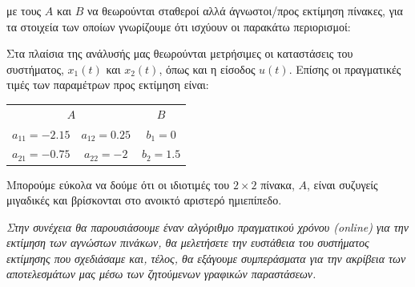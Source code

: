 \documentclass[12pt]{article} %
\numberwithin{equation}{section}  %
\begin{document}
\vspace{-\topsep}

\noindent με τους $A$ και $B$ να θεωρούνται σταθεροί αλλά άγνωστοι/προς εκτίμηση πίνακες, 
για τα στοιχεία των οποίων γνωρίζουμε ότι ισχύουν οι παρακάτω περιορισμοί: 

\vspace{-\topsep}

\begin{center}
    \fbox{$a_{11} \in [-3, -1]$ \& $b_2 \in [1, +\infty)$}
\end{center}


Στα πλαίσια της ανάλυσής μας θεωρούνται μετρήσιμες οι καταστάσεις του συστήματος, $x_1(t)$ και $x_2(t)$, όπως και η είσοδος $u(t)$. 
Επίσης οι πραγματικές τιμές των παραμέτρων προς εκτίμηση είναι: 

\vspace{-\topsep}

\begin{table}[!ht]
    \centering
    \begin{tabular}{c c | c}
        \multicolumn{2}{c}{$A$} & $B$ \\
        $a_{11} = -2.15$ & $a_{12} = 0.25$ & $b_{1} = 0$ \\
        $a_{21} = -0.75$ & $a_{22} = -2$ & $b_{2} = 1.5$
    \end{tabular}
\end{table}

\vspace{-\topsep}

\noindent Μπορούμε εύκολα να δούμε ότι οι ιδιοτιμές του $2 \times 2$ πίνακα, $A$, είναι συζυγείς μιγαδικές και βρίσκονται στο ανοικτό αριστερό ημιεπίπεδο.

\begin{center}
    \textit{
    Στην συνέχεια θα παρουσιάσουμε έναν αλγόριθμο πραγματικού χρόνου (online) για την εκτίμηση των αγνώστων πινάκων, 
    θα μελετήσετε την ευστάθεια του συστήματος εκτίμησης που σχεδιάσαμε και, τέλος, θα εξάγουμε συμπεράσματα για την ακρίβεια των αποτελεσμάτων μας μέσω των ζητούμενων γραφικών παραστάσεων.
    }
\end{center}


\newpage

\end{document}

